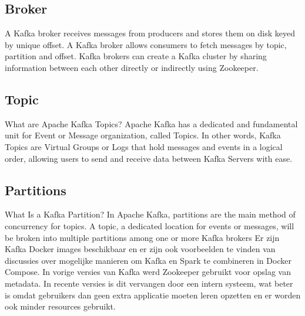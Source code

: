 \subsection{Broker}
A Kafka broker receives messages from producers and stores them on disk keyed by unique offset. A Kafka broker allows consumers to fetch messages by topic, partition and offset. Kafka brokers can create a Kafka cluster by sharing information between each other directly or indirectly using Zookeeper.\autocite{GitBook2023}

\subsection{Topic}
What are Apache Kafka Topics? Apache Kafka has a dedicated and fundamental unit for Event or Message organization, called Topics. In other words, Kafka Topics are Virtual Groups or Logs that hold messages and events in a logical order, allowing users to send and receive data between Kafka Servers with ease.\autocite{Ishwarya2022}

\subsection{Partitions}
What Is a Kafka Partition? In Apache Kafka, partitions are the main method of concurrency for topics. A topic, a dedicated location for events or messages, will be broken into multiple partitions among one or more Kafka brokers\autocite{Carder2022}
\newline
\newline
Er zijn Kafka Docker images beschikbaar en er zijn ook voorbeelden te vinden van discussies over mogelijke manieren om Kafka en Spark te combineren in Docker Compose.
\newline
\newline
In vorige versies van Kafka werd Zookeeper gebruikt voor opslag van metadata. In recente versies is dit vervangen door een intern systeem, wat beter is omdat gebruikers dan geen extra applicatie moeten leren opzetten en er worden ook minder resources gebruikt.

